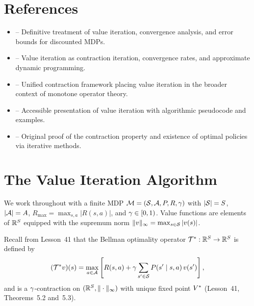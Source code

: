 \documentclass[11pt,a4paper]{article}
\begin{document}

\section{References}
\label{sec:references}

\begin{itemize}
    \item \citet[Chapter 6, Sections 6.1--6.3]{puterman2014} --
    Definitive treatment of value iteration, convergence analysis, and
    error bounds for discounted MDPs.
    \item \citet[Chapter 1, Sections 1.2--1.3]{bertsekas2012} --
    Value iteration as contraction iteration, convergence rates, and
    approximate dynamic programming.
    \item \citet{denardo1967} -- Unified contraction framework placing
    value iteration in the broader context of monotone operator theory.
    \item \citet[Chapter 4]{suttonbarto2018} -- Accessible presentation
    of value iteration with algorithmic pseudocode and examples.
    \item \citet{blackwell1962} -- Original proof of the contraction
    property and existence of optimal policies via iterative methods.
\end{itemize}


\section{The Value Iteration Algorithm}
\label{sec:vi-algorithm}

We work throughout with a finite MDP
$\mathcal{M} = (\mathcal{S}, \mathcal{A}, P, R, \gamma)$ with
$|\mathcal{S}| = S$, $|\mathcal{A}| = A$,
$R_{\max} = \max_{s,a} |R(s,a)|$, and $\gamma \in [0,1)$.
Value functions are elements of $\mathbb{R}^S$ equipped with the supremum
norm $\|v\|_\infty = \max_{s \in \mathcal{S}} |v(s)|$.

Recall from Lesson~41 that the Bellman optimality operator
$\mathcal{T}^* : \mathbb{R}^S \to \mathbb{R}^S$ is defined by
\[
    (\mathcal{T}^* v)(s) = \max_{a \in \mathcal{A}}
    \left[ R(s,a) + \gamma \sum_{s' \in \mathcal{S}}
    P(s' \mid s,a)\, v(s') \right],
\]
and is a $\gamma$-contraction on $(\mathbb{R}^S, \|\cdot\|_\infty)$ with
unique fixed point $V^*$ (Lesson~41, Theorems~5.2 and~5.3).
\end{document}
